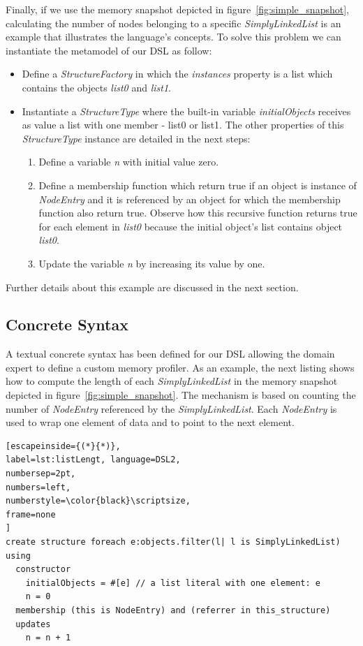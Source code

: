 Finally, if we use the memory snapshot depicted in figure~\ref{fig:simple_snapshot}, calculating the number of nodes belonging to a specific \textit{SimplyLinkedList} is an example that illustrates the language's concepts.
To solve this problem we can instantiate the metamodel of our DSL as follow:
\begin{itemize}
\item Define a \textit{StructureFactory} in which the \textit{instances} property is a list which contains the objects \textit{list0} and \textit{list1}.
\item Instantiate a \textit{StructureType} where the built-in variable \textit{initialObjects} receives as value a list with one member - list0 or list1.
      The other properties of this \textit{StructureType} instance are detailed in the next steps: 
      \begin{enumerate}
      \item Define a variable \textit{n} with initial value zero.
      \item Define a membership function which return true if an object is instance of \textit{NodeEntry} and it is referenced by an object for which the membership function also return true. Observe how this recursive function returns true for each element in \textit{list0} because the initial object's list contains object \textit{list0}. 
      \item Update the variable \textit{n} by increasing its value by one.
      \end{enumerate}  
\end{itemize}
Further details about this example are discussed in the next section.

\subsection{Concrete Syntax}\label{sec:concrete-syntax}

A textual concrete syntax has been defined for our DSL allowing the domain expert to define a custom memory profiler.
As an example, the next listing shows how to compute the length of each \textit{SimplyLinkedList} in the memory snapshot depicted in figure~\ref{fig:simple_snapshot}.
The mechanism is based on counting the number of \textit{NodeEntry} referenced by the \textit{SimplyLinkedList}.
Each \textit{NodeEntry} is used to wrap one element of data and to point to the next element.

\begin{lstlisting}[escapeinside={(*}{*)}, 
label=lst:listLengt, language=DSL2,
numbersep=2pt,
numbers=left,
numberstyle=\color{black}\scriptsize,
frame=none
]
create structure foreach e:objects.filter(l| l is SimplyLinkedList) using
  constructor
    initialObjects = #[e] // a list literal with one element: e
    n = 0
  membership (this is NodeEntry) and (referrer in this_structure)
  updates 
    n = n + 1
\end{lstlisting}

